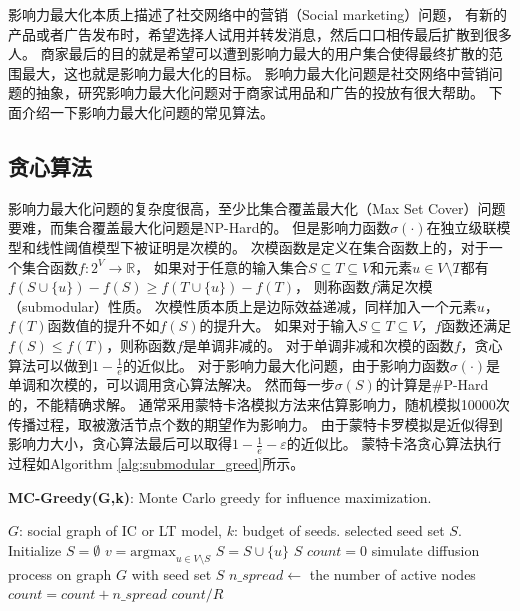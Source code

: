 影响力最大化本质上描述了社交网络中的营销（Social marketing）问题，
有新的产品或者广告发布时，希望选择人试用并转发消息，然后口口相传最后扩散到很多人。
商家最后的目的就是希望可以遭到影响力最大的用户集合使得最终扩散的范围最大，这也就是影响力最大化的目标。
影响力最大化问题是社交网络中营销问题的抽象，研究影响力最大化问题对于商家试用品和广告的投放有很大帮助。
下面介绍一下影响力最大化问题的常见算法。

\subsection{贪心算法}
影响力最大化问题的复杂度很高，至少比集合覆盖最大化（Max Set Cover）问题要难，而集合覆盖最大化问题是NP-Hard的。
但是影响力函数$\sigma(\cdot)$在独立级联模型和线性阈值模型下被证明是次模的\cite{Kempe2003maximizing}。
次模函数是定义在集合函数上的，对于一个集合函数$f:2^V \to \mathbb{R}$，
如果对于任意的输入集合$S \subseteq T \subseteq V$和元素$u \in V \setminus T$都有
$f(S \cup \{u\}) - f(S) \geq f(T \cup \{u\}) - f(T)$，
则称函数$f$满足次模（submodular）性质。
次模性质本质上是边际效益递减，同样加入一个元素$u$，$f(T)$函数值的提升不如$f(S)$的提升大。
如果对于输入$S \subseteq T \subseteq V$，$f$函数还满足$f(S) \leq f(T)$，则称函数$f$是单调非减的。
对于单调非减和次模的函数$f$，贪心算法可以做到$1-\frac{1}{e}$的近似比。
对于影响力最大化问题，由于影响力函数$\sigma(\cdot)$是单调和次模的，可以调用贪心算法解决。
然而每一步$\sigma(S)$的计算是$\#$P-Hard的，不能精确求解。
通常采用蒙特卡洛模拟方法来估算影响力，随机模拟10000次传播过程，取被激活节点个数的期望作为影响力。
由于蒙特卡罗模拟是近似得到影响力大小，贪心算法最后可以取得$1-\frac{1}{e}-\varepsilon$的近似比。
蒙特卡洛贪心算法执行过程如Algorithm \ref{alg:submodular_greed}所示。

\begin{algorithm}
	\caption{\textbf{MC-Greedy(G,k)}: Monte Carlo greedy for influence maximization.}
	\label{alg:mc_greed} 
	\begin{algorithmic}[1]
		\Require $G$: social graph of IC or LT model, $k$: budget of seeds.
		\Ensure selected seed set $S$.
		\State Initialize $S = \emptyset$
			\State $v = \mathrm{argmax}_{u \in V \setminus S}$ 
			\State $S = S \cup \{u\}$
		\EndFor
		\State \Return $S$
			\State $count=0$
				\State simulate diffusion process on graph $G$ with seed set $S$
				\State $n\_spread \gets$ the number of active nodes
				\State $count = count + n\_spread$
			\EndFor
			\State \Return $count/R$
		\EndFunction
	\end{algorithmic} 
\end{algorithm}

